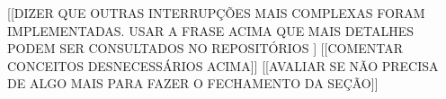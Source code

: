 \documentclass[a4paper]{llncs}
\begin{document}
%
%
%
%
%
%  
%
%
[[DIZER QUE OUTRAS INTERRUPÇÕES MAIS COMPLEXAS FORAM IMPLEMENTADAS. USAR A FRASE ACIMA QUE MAIS DETALHES PODEM SER CONSULTADOS NO REPOSITÓRIOS ]
[[COMENTAR CONCEITOS DESNECESSÁRIOS ACIMA]]
[[AVALIAR SE NÃO PRECISA DE ALGO MAIS PARA FAZER O FECHAMENTO DA SEÇÃO]]
\end{document}
